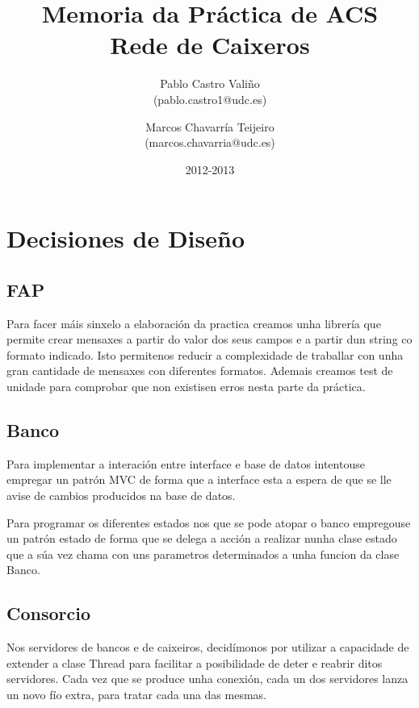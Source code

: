 \documentclass[a4paper,titlepage]{article}
\begin{document}
\title{\Huge{Memoria da Práctica de ACS} \\ \small{Rede de Caixeros}}
\author{Pablo Castro Valiño \\ \small{(pablo.castro1@udc.es)} \and
Marcos Chavarría Teijeiro \\ \small{(marcos.chavarria@udc.es)}}
\date{2012-2013}
\maketitle

\tableofcontents

\newpage

\section{Decisiones de Diseño}
\subsection {FAP}
Para facer máis sinxelo a elaboración da practica creamos unha librería que permite crear mensaxes a partir do valor dos seus campos e a partir dun string co formato indicado. Isto permitenos reducir a complexidade de traballar con unha gran cantidade de mensaxes con diferentes formatos. Ademais creamos test de unidade para comprobar que non existisen erros nesta parte da práctica.

\subsection {Banco}
Para implementar a interación entre interface e base de datos intentouse empregar un patrón MVC de forma que a interface esta a espera de que se lle avise de cambios producidos na base de datos.

Para programar os diferentes estados nos que se pode atopar o banco empregouse un patrón estado de forma que se delega a acción a realizar nunha clase estado que a súa vez chama con uns parametros determinados a unha funcion da clase Banco.


\subsection {Consorcio}
Nos servidores de bancos e de caixeiros, decidímonos por utilizar a capacidade de extender a clase Thread para facilitar a posibilidade de deter e reabrir ditos servidores. Cada vez que se produce unha conexión, cada un dos servidores lanza un novo fío extra, para tratar cada una das mesmas.
\end{document}
